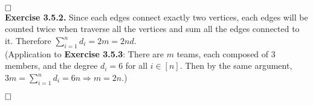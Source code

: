 \documentclass[12pt]{extarticle}
\begin{document}
$\hspace{\fill}\square$\\
\textbf{Exercise 3.5.2.}
Since each edges connect exactly two vertices, each edges will be counted twice when traverse all the vertices and sum all the edges connected to it.
Therefore $\sum_{i=1}^nd_i=2m=2nd$. \\
(Application to \textbf{Exercise 3.5.3}: There are $m$ teams, each composed of $3$ members, and the degree $d_i=6$ for all $i\in[n]$. Then by the same argument, $3m=\sum_{i=1}^nd_i=6n\Rightarrow m=2n$.)

$\hspace{\fill}\square$\\
\end{document}
